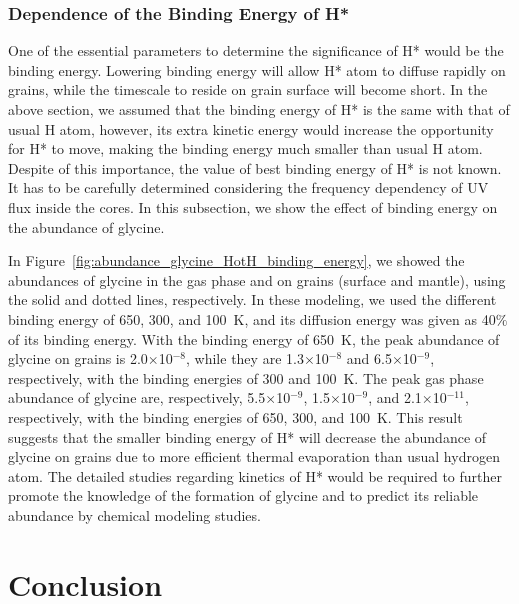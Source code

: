 \documentclass{aastex61}
\begin{document}
%


\subsubsection{Dependence of the Binding Energy of H*}
One of the essential parameters to determine the significance of H* would be the binding energy.
%
Lowering binding energy will allow H* atom to diffuse rapidly on grains, while the timescale to reside on grain surface will become short.
%
In the above section, we assumed that the binding energy of H* is the same with that of usual H atom, however, its extra kinetic energy would increase the opportunity for H* to move, making the binding energy much smaller than usual H atom.
%
Despite of this importance, the value of best binding energy of H* is not known.
%
It has to be carefully determined considering the frequency dependency of UV flux inside the cores. 
%
In this subsection, we show the effect of binding energy on the abundance of glycine.

In Figure~\ref{fig:abundance_glycine_HotH_binding_energy}, we showed the abundances of glycine in the gas phase and on grains (surface and mantle), using the solid and dotted lines, respectively.
%
In these modeling, we used the different binding energy of 650, 300, and 100~K, and its diffusion energy was given as 40$\%$ of its binding energy.
%
With the binding energy of 650~K, the peak abundance of glycine on grains is 2.0$\times$10$^{-8}$, while they are 1.3$\times$10$^{-8}$ and 6.5$\times$10$^{-9}$, respectively, with the binding energies of 300 and 100~K.
%
The peak gas phase abundance of glycine are, respectively, 5.5$\times$10$^{-9}$, 1.5$\times$10$^{-9}$, and 2.1$\times$10$^{-11}$, respectively, with the binding energies of 650, 300, and 100~K.
%
This result suggests that the smaller binding energy of H* will decrease the abundance of glycine on grains due to more efficient thermal evaporation than usual hydrogen atom.
%
The detailed studies regarding kinetics of H* would be required to further promote the knowledge of the formation of glycine and to predict its reliable abundance by chemical modeling studies.


\section{Conclusion}
\end{document}
